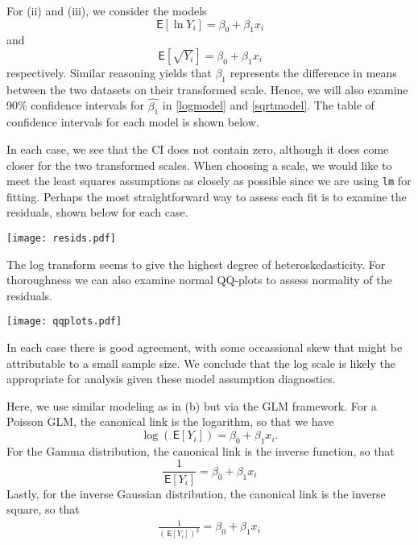 \documentclass[11pt]{article}
\newcommand*\ba{\[ \begin{aligned}}
\newcommand*\ea{\end{aligned} \]}
\newcommand*\E[1]{\;\mathsf{E}\left[#1\right]}
\newcommand*\estim[1]{\widehat{#1}}
\renewcommand\;{\,}
\begin{document}
For (ii) and (iii), we consider the models 
\begin{equation}\label{logmodel}
\E{\ln{Y_i}} = \beta_0 + \beta_1 x_i
\end{equation}
and
\begin{equation}\label{sqrtmodel}
\E{\sqrt{Y_i}} = \beta_0 + \beta_1 x_i
\end{equation}
respectively. Similar reasoning yields that $\beta_1$ represents the difference in means between the two datasets on their transformed scale. Hence, we will also examine 90\% confidence intervals for $\estim{\beta_1}$ in \eqref{logmodel} and \eqref{sqrtmodel}. 
The table of confidence intervals for each model is shown below.

In each case, we see that the CI does not contain zero, although it does come closer for the two transformed scales. When choosing a scale, we would like to meet the least squares assumptions as closely as possible since we are using \texttt{lm} for fitting. Perhaps the most straightforward way to assess each fit is to examine the residuals, shown below for each case. 
\begin{center}
\texttt{[image: resids.pdf]}
\end{center}
The log transform seems to give the highest degree of heteroskedasticity.
For thoroughness we can also examine normal QQ-plots to assess normality of the residuals.
\begin{center}
    \texttt{[image: qqplots.pdf]}
\end{center}
In each case there is good agreement, with some occassional skew that might be attributable to a small sample size.
We conclude that the log scale is likely the appropriate for analysis given these model assumption diagnostics.
\item
Here, we use similar modeling as in (b) but via the GLM framework. For a Poisson GLM, the canonical link is the logarithm, so that we have
\begin{equation}
\log\left(\E{Y_i}\right) = \beta_0 + \beta_1 x_i.
\end{equation}
For the Gamma distribution, the canonical link is the inverse function, so that
\begin{equation}
\frac{1}{\E{Y_i}} = \beta_0 + \beta_1 x_i
\end{equation}
Lastly, for the inverse Gaussian distribution, the canonical link is the inverse square, so that
\ba
\frac{1}{\left(\E{Y_i}\right)^2} = \beta_0 + \beta_1 x_i
\ea
\end{document}
